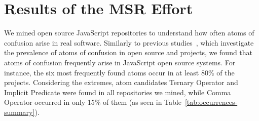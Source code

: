 
\section{Results of the MSR Effort}
\label{sec:msr-results} 

We mined \minedprojects open source JavaScript repositories to understand how
often atoms of confusion arise in real software. 
Similarly to previous studies~\cite{DBLP:conf/msr/GopsteinZFC18,DBLP:journals/ese/MedeirosLAAKRG19}, which investigate
the prevalence of atoms of confusion in open source \clang and \cpplang projects, we found that atoms of confusion
frequently arise in JavaScript open source systems. For instance, the six most frequently found atoms
occur in at least 80\% of the projects. Considering the extremes, atom candidates Ternary Operator and Implicit Predicate were found in all repositories we mined,
while Comma Operator occurred in only 15\% of them (as seen in Table~\ref{tab:occurrences-summary}).

